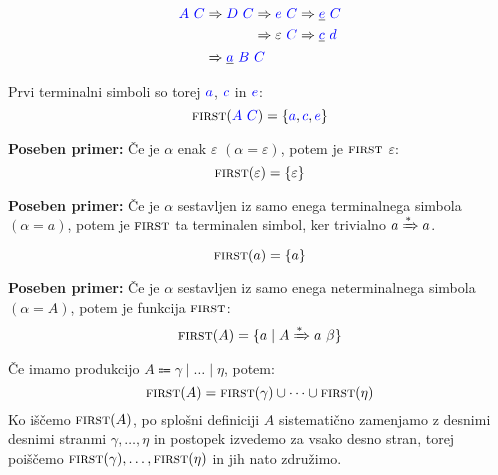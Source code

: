 \documentclass{article}
\newcommand{\Special}[1]{\textbf{#1}}
\newcommand{\FIRST}{\textsc{first}}
\newcommand{\Symbol}[1]{\textcolor{blue}{#1}}
\newcommand{\Null}{\varepsilon}
\newcommand{\Arrow}{\Coloneq}
\newcommand{\Derive}{\Rightarrow}
\newcommand{\DeriveStar}{\xRightarrow{\ast}}
\newcommand{\Seq}{\ }
\newcommand{\Union}{\mathrel{|}}
\begin{document}
\begin{equation*}
  \Symbol{A} \Seq \Symbol{C} \begin{aligned}[t]
    &\Derive \Symbol{D} \Seq \Symbol{C} \begin{aligned}[t]
      &\Derive \Symbol{e} \Seq \Symbol{C} \Derive \underline{\Symbol{e}} \Seq \Symbol{C} \\
      &\Derive \Null \Seq \Symbol{C} \Derive \underline{\Symbol{c}} \Seq \Symbol{d} \\
    \end{aligned}\\
    &\Derive \underline{\Symbol{a}} \Seq \Symbol{B} \Seq \Symbol{C}
  \end{aligned}
\end{equation*}

Prvi terminalni simboli so torej $\Symbol{a}$, $\Symbol{c}$ in $\Symbol{e}$:
\begin{equation*}
  \FIRST(\Symbol{A} \Seq \Symbol{C}) = \{\Symbol{a}, \Symbol{c}, \Symbol{e}\}
\end{equation*}

\Special{Poseben primer:} Če je $\alpha$ enak $\Null$ ${(\alpha = \Null)}$, potem je $\FIRST$ $\Null$:
\begin{equation*}
  \FIRST(\Null) = \{ \Null \}
\end{equation*}

\Special{Poseben primer:} Če je $\alpha$ sestavljen iz samo enega terminalnega simbola ${(\alpha = a)}$, potem je $\FIRST$ ta terminalen simbol, ker trivialno $a \DeriveStar a$.
\begin{equation*}
  \FIRST(a) = \{ a \}
\end{equation*}

\Special{Poseben primer:} Če je $\alpha$ sestavljen iz samo enega neterminalnega simbola ${(\alpha = A)}$, potem je funkcija $\FIRST$:
\begin{equation*}
  \FIRST(A) = \{ a \mid A \DeriveStar a \Seq \beta \}
\end{equation*}
Če imamo produkcijo $A \Arrow \gamma \Union \dots \Union \eta$, potem:
\begin{equation*}
  \FIRST(A) = \FIRST(\gamma) \cup \dots \cup \FIRST(\eta)
\end{equation*}
Ko iščemo $\FIRST(A)$, po splošni definiciji $A$ sistematično zamenjamo z desnimi desnimi stranmi $\gamma, \dots, \eta$ in postopek izvedemo za vsako desno stran, torej poiščemo $\FIRST(\gamma), \dots, \FIRST(\eta)$ in jih nato združimo.
\end{document}

